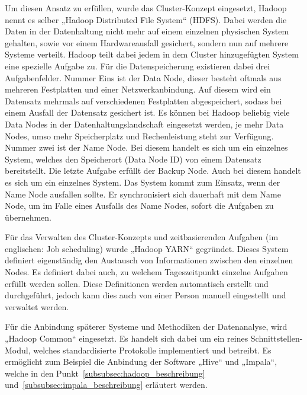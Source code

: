 Um diesen Ansatz zu erfüllen, wurde das Cluster-Konzept eingesetzt, Hadoop nennt
es selber „Hadoop Distributed File System“ (HDFS). Dabei werden die Daten in
der Datenhaltung nicht mehr auf einem einzelnen physischen System gehalten,
sowie vor einem Hardwareausfall gesichert, sondern nun auf mehrere Systeme
verteilt. Hadoop teilt dabei jedem in dem Cluster hinzugefügten System eine
spezielle Aufgabe zu. Für die Datenspeicherung existieren dabei drei
Aufgabenfelder. Nummer Eins ist der Data Node, dieser besteht oftmals aus
mehreren Festplatten und einer Netzwerkanbindung. Auf diesem wird ein
Datensatz mehrmals auf verschiedenen Festplatten abgespeichert, sodass bei
einem Ausfall der Datensatz gesichert ist. Es können bei Hadoop beliebig viele
Data Nodes in der Datenhaltungslandschaft eingesetzt werden, je mehr Data
Nodes, umso mehr Speicherplatz und Rechenleistung steht zur Verfügung. Nummer
zwei ist der Name Node. Bei diesem handelt es sich um ein einzelnes System,
welches den Speicherort (Data Node ID) von einem Datensatz bereitstellt. Die
letzte Aufgabe erfüllt der Backup Node. Auch bei diesem handelt es sich um ein
einzelnes System. Das System kommt zum Einsatz, wenn der Name Node ausfallen
sollte. Er synchronisiert sich dauerhaft mit dem Name Node, um im Falle eines
Ausfalls des Name Nodes, sofort die Aufgaben zu übernehmen.

Für das Verwalten des Cluster-Konzepts und zeitbasierenden Aufgaben (im
englischen: Job scheduling) wurde „Hadoop YARN“ gegründet. Dieses System
definiert eigenständig den Austausch von Informationen zwischen den einzelnen
Nodes. Es definiert dabei auch, zu welchem Tageszeitpunkt einzelne Aufgaben
erfüllt werden sollen. Diese Definitionen werden automatisch erstellt und
durchgeführt, jedoch kann dies auch von einer Person manuell eingestellt und
verwaltet werden.

Für die Anbindung späterer Systeme und Methodiken der Datenanalyse, wird
„Hadoop Common“ eingesetzt. Es handelt sich dabei um ein reines
Schnittstellen-Modul, welches standardisierte Protokolle implementiert und
betreibt. Es ermöglicht zum Beispiel die Anbindung der Software „Hive“ und
„Impala“, welche in den Punkt~\ref{subsubsec:hadoop_beschreibung}
und~\ref{subsubsec:impala_beschreibung} erläutert werden.

